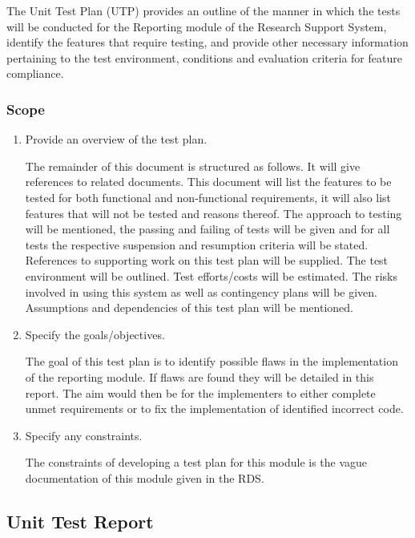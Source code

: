 The Unit Test Plan (UTP) provides an outline of the manner in which the tests will be conducted for the Reporting module of the Research Support System, identify the features that require testing, and provide other necessary information pertaining to the test environment, conditions and evaluation criteria for feature compliance.
 
\subsubsection{Scope}
\begin{enumerate}
	\item Provide an overview of the test plan.
		
The remainder of this document is structured as follows. It will give references to related documents. This document will list the features to be tested for both functional and non-functional requirements, it will also list features that will not be tested and reasons thereof. The approach to testing will be mentioned, the passing and failing of tests will be given and for all tests the respective suspension and resumption criteria will be stated. References to supporting work on this test plan will be supplied. The test environment will be outlined. Test efforts/costs will be estimated. The risks involved in using this system as well as contingency plans will be given. Assumptions and dependencies of this test plan will be mentioned.

	\item Specify the goals/objectives.

The goal of this test plan is to identify possible flaws in the implementation of the reporting module. If flaws are found they will be detailed in this report. The aim would then be for the implementers to either complete unmet requirements or to fix the implementation of identified incorrect code.

	\item Specify any constraints.

The constraints of developing a test plan for this module is the vague documentation of this module given in the RDS. 
\end{enumerate} 

\subsection{Unit Test Report}

